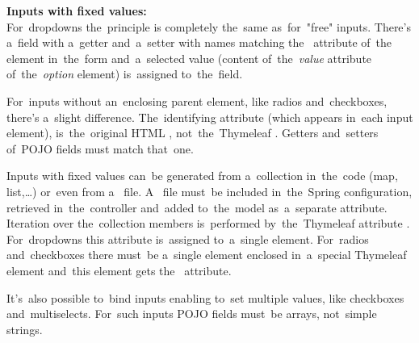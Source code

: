 \noindent \textbf{Inputs with fixed values:}\\
\noindent For~dropdowns the~principle is completely the~same as~for~"free" inputs.
There's a~field with a~getter and~a~setter with names matching the~ attribute of~the~ element in~the~form and~a~selected value (content of~the~\textit{value} attribute of~the~\textit{option} element) is~assigned to~the~field.

For~inputs without an~enclosing parent element, like radios and~checkboxes, there's a~slight difference.
The~identifying attribute (which appears in~each input element), is~the~original HTML , not~the~Thymeleaf .
Getters and~setters of~POJO fields must match that~one.

Inputs with fixed values can~be generated from a~collection in~the~code (map, list,\dots) or~even from a~\hyperref[properties]{} file.
A~ file must~be included in~the~Spring configuration, retrieved in~the~controller and~added to~the~model as~a~separate attribute.
Iteration over the~collection members is~performed by~the~Thymeleaf attribute .
For~dropdowns this attribute is~assigned to~a~single  element.
For~radios and~checkboxes there must~be a~single  element enclosed in~a~special Thymeleaf element  and~this element gets the~ attribute.

It's~also possible to~bind inputs enabling to~set multiple values, like checkboxes and~multiselects.
For~such inputs POJO fields must~be arrays, not~simple strings.
\newpage

